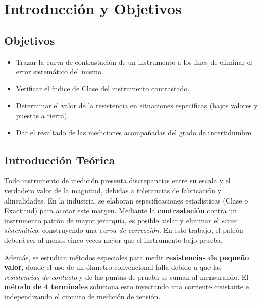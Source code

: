 \chapter{Introducción y Objetivos}

\section{Objetivos}
\begin{itemize}
    \item Trazar la curva de contrastación de un instrumento a los fines de eliminar el error sistemático del mismo.
    \item Verificar el índice de Clase del instrumento contrastado.
    \item Determinar el valor de la resistencia en situaciones específicas (bajos valores y puestas a tierra).
    \item Dar el resultado de las mediciones acompañadas del grado de incertidumbre.
\end{itemize}

\section{Introducción Teórica}
Todo instrumento de medición presenta discrepancias entre su escala y el verdadero valor de la magnitud, debidas a tolerancias de fabricación y alinealidades. En la industria, se elaboran especificaciones estadísticas (Clase o Exactitud) para acotar este margen. Mediante la \textbf{contrastación} contra un instrumento patrón de mayor jerarquía, es posible aislar y eliminar el \textit{error sistemático}, construyendo una \textit{curva de corrección}. En este trabajo, el patrón deberá ser al menos cinco veces mejor que el instrumento bajo prueba.

Además, se estudian métodos especiales para medir \textbf{resistencias de pequeño valor}, donde el uso de un óhmetro convencional falla debido a que las \textit{resistencias de contacto} y de las puntas de prueba se suman al mensurando. El \textbf{método de 4 terminales} soluciona esto inyectando una corriente constante e independizando el circuito de medición de tensión. 
